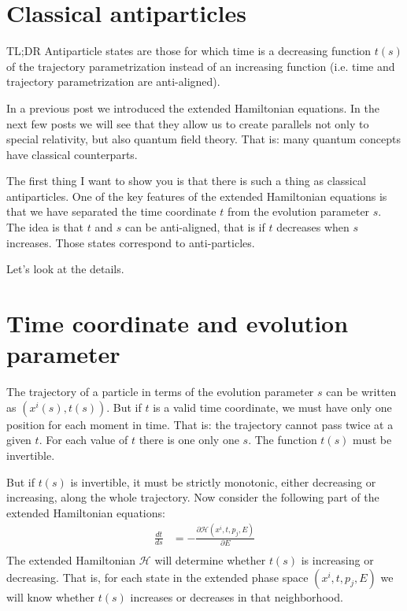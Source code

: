\documentclass[aps,pra,10pt,floatfix,nofootinbib]{revtex4-1}
\theoremstyle{definition}
\begin{document}
\section{Classical antiparticles}

TL;DR Antiparticle states are those for which time is a decreasing function $t(s)$ of the trajectory parametrization instead of an increasing function (i.e. time and trajectory parametrization are anti-aligned).

In a previous post we introduced the extended Hamiltonian equations. In the next few posts we will see that they allow us to create parallels not only to special relativity, but also quantum field theory. That is: many quantum concepts have classical counterparts.

The first thing I want to show you is that there is such a thing as classical antiparticles. One of the key features of the extended Hamiltonian equations is that we have separated the time coordinate $t$ from the evolution parameter $s$. The idea is that $t$ and $s$ can be anti-aligned, that is if $t$ decreases when $s$ increases. Those states correspond to anti-particles.

Let's look at the details.

\section{Time coordinate and evolution parameter}

The trajectory of a particle in terms of the evolution parameter $s$ can be written as $(x^i(s), t(s))$. But if $t$ is a valid time coordinate, we must have only one position for each moment in time. That is: the trajectory cannot pass twice at a given $t$. For each value of $t$ there is one only one $s$. The function $t(s)$ must be invertible.

But if $t(s)$ is invertible, it must be strictly monotonic, either decreasing or increasing, along the whole trajectory. Now consider the following part of the extended Hamiltonian equations:
\begin{equation}
\begin{aligned}
\frac{dt}{ds} &= - \frac{\partial \mathcal{H}(x^i,t,p_j,E)}{\partial E} \\
\end{aligned}
\label{ExtendedHamiltonTime}
\end{equation}
The extended Hamiltonian $\mathcal{H}$ will determine whether $t(s)$ is increasing or decreasing. That is, for each state in the extended phase space $(x^i,t,p_j,E)$ we will know whether $t(s)$ increases or decreases in that neighborhood.
\end{document}
